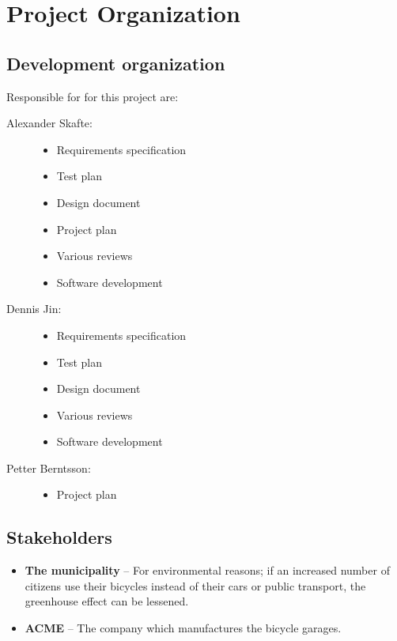 \documentclass[12pt,titlepage]{article}
\begin{document}

\section{Project Organization}

\subsection{Development organization}

Responsible for for this project are:

\begin{description}
	\item[Alexander Skafte:] \hfill
		\begin{itemize}
			\item Requirements specification
			\item Test plan
			\item Design document
			\item Project plan
			\item Various reviews
			\item Software development
		\end{itemize}
	\item[Dennis Jin:] \hfill
		\begin{itemize}
			\item Requirements specification
			\item Test plan
			\item Design document
			\item Various reviews
			\item Software development
		\end{itemize}
	\item[Petter Berntsson:] \hfill
		\begin{itemize}
			\item Project plan
		\end{itemize}
\end{description}

\subsection{Stakeholders}

\begin{itemize}
	\item \textbf{The municipality} -- For environmental reasons; if an
		increased number of citizens use their bicycles instead of their
		cars or public transport, the greenhouse effect can be lessened.
	\item \textbf{ACME} -- The company which manufactures the bicycle
		garages.
\end{itemize}
\end{document}
